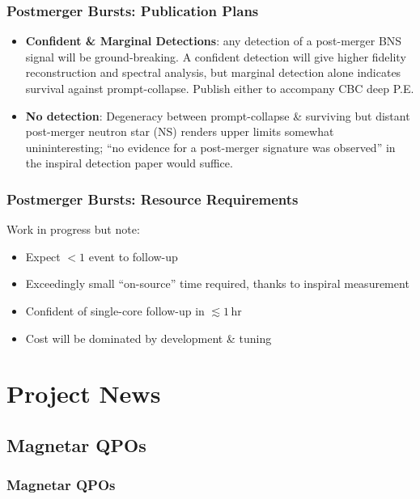 \documentclass{beamer}
\def\ns#1{neutron star#1 (NS#1)\gdef\ns{NS}}
\begin{document}
\begin{frame}
    \frametitle{Postmerger Bursts: Publication Plans}
    \begin{itemize}
        \item {\bf Confident \& Marginal Detections}: any detection of a
            post-merger BNS signal will be ground-breaking.  A confident
            detection will give higher fidelity reconstruction and spectral
            analysis, but marginal detection alone indicates survival against
            prompt-collapse.  Publish either to accompany CBC deep P.E.
        \item {\bf No detection}: Degeneracy between prompt-collapse \&
            surviving but distant post-merger \ns{} renders upper limits
            somewhat unininteresting; ``no evidence for a post-merger signature
            was observed'' in the inspiral detection paper would suffice.
    \end{itemize}
\end{frame}

\begin{frame}
    \frametitle{Postmerger Bursts: Resource Requirements}
    Work in progress but note:
    \begin{itemize}
        \item Expect $<1$ event to follow-up
        \item Exceedingly small ``on-source'' time required, thanks to inspiral
            measurement
        \item Confident of single-core follow-up in $\lesssim 1$\,hr
        \item Cost will be dominated by development \& tuning
    \end{itemize}
\end{frame}


\section{Project News} 
\begin{frame}\tableofcontents[currentsection]
\end{frame}

\subsection{Magnetar QPOs}
\begin{frame}\frametitle{Magnetar QPOs} 
\end{frame}
\end{document}
